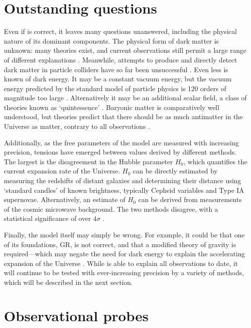 \documentclass{scrbook}
\begin{document}
\section{Outstanding questions}
\label{Sec:open_questions}

Even if \lcdm{} is correct, it leaves many questions unanswered, including the physical nature of its dominant components. The physical form of dark matter is unknown: many theories exist, and current observations still permit a large range of different explanations \citep{Khimey2021}. Meanwhile, attempts to produce and directly detect dark matter in particle colliders have so far been unsuccessful \citep{Trevisani2018}. Even less is known of dark energy. It may be a constant vacuum energy, but the vacuum energy predicted by the standard model of particle physics is 120 orders of magnitude too large \citep[e.g][]{Carroll2001}. Alternatively it may be an additional scalar field, a class of theories known as `quintessence' \citep{Ratra1988, Caldwell1998, Carroll1998, Zlatev1999, Amendola2000}. Baryonic matter is comparatively well understood, but theories predict that there should be as much antimatter in the Universe as matter, contrary to all observations \citep{Sakharov1967, Steigman2018}.

Additionally, as the free parameters of the model are measured with increasing precision, tensions have emerged between values derived by different methods. The largest is the disagreement in the Hubble parameter $H_0$, which quantifies the current expansion rate of the Universe. $H_0$ can be directly estimated by measuring the redshifts of distant galaxies and determining their distance using `standard candles' of known brightness, typically Cepheid variables and Type IA supernovae. Alternatively, an estimate of $H_0$ can be derived from measurements of the cosmic microwave background. The two methods disagree, with a statistical significance of over $4 \sigma$ \citep{Planck2018VI, Riess2019, Verde2019}.

Finally, the model itself may simply be wrong. For example, it could be that one of its foundations, GR, is not correct, and that a modified theory of gravity is required---which may negate the need for dark energy to explain the accelerating expansion of the Universe \citep{Clifton2012, Joyce2016}. While \lcdm{} is able to explain all observations to date, it will continue to be tested with ever-increasing precision by a variety of methods, which will be described in the next section.

\section{Observational probes}
\end{document}
